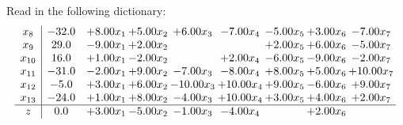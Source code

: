 \documentclass[9pt]{article}
\begin{document}
Read in the following dictionary:
\[\begin{array}{c| c c@{\hskip 2pt} c@{\hskip 2pt} c@{\hskip 2pt} c@{\hskip 2pt} c@{\hskip 2pt} c@{\hskip 2pt} c@{\hskip 2pt} }
 x_{8}   &  -32.0 & +  8.00 x_{1} & +  5.00 x_{2} & +  6.00 x_{3} & -7.00 x_{4} & -5.00 x_{5} & +  3.00 x_{6} & -7.00 x_{7}\\
 x_{9}   &  29.0 & -9.00 x_{1} & +  2.00 x_{2} &    &   & +  2.00 x_{5} & +  6.00 x_{6} & -5.00 x_{7}\\
 x_{10}   &  16.0 & +  1.00 x_{1} & -2.00 x_{2} &   & +  2.00 x_{4} & -6.00 x_{5} & -9.00 x_{6} & -2.00 x_{7}\\
 x_{11}   &  -31.0 & -2.00 x_{1} & +  9.00 x_{2} & -7.00 x_{3} & -8.00 x_{4} & +  8.00 x_{5} & +  5.00 x_{6} & + 10.00 x_{7}\\
 x_{12}   &  -5.0 & +  3.00 x_{1} & +  6.00 x_{2} & -10.00 x_{3} & + 10.00 x_{4} & +  9.00 x_{5} & -6.00 x_{6} & +  9.00 x_{7}\\
 x_{13}   &  -24.0 & +  1.00 x_{1} & +  8.00 x_{2} & -4.00 x_{3} & + 10.00 x_{4} & +  3.00 x_{5} & +  4.00 x_{6} & +  2.00 x_{7}\\
\hline
z    &  0.0 & +  3.00 x_{1} & -5.00 x_{2} & -1.00 x_{3} & -4.00 x_{4} &   & +  2.00 x_{6} &   \\
\end{array}\]
\end{document}
